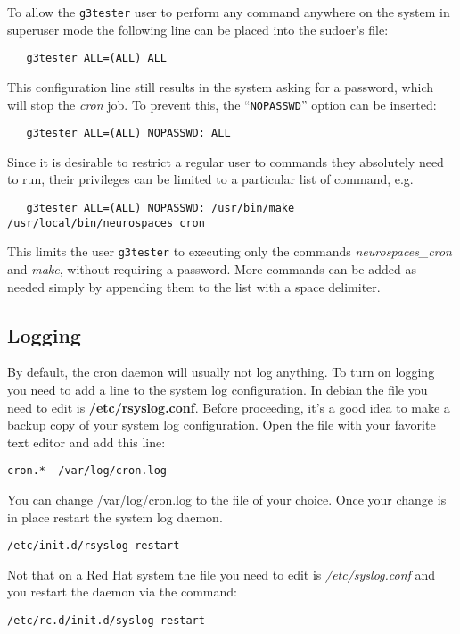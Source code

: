 \documentclass[12pt]{article}
\begin{document}
To allow the {\tt g3tester} user to perform any command anywhere on the system in superuser mode the following line can be placed into the sudoer's file:
\begin{verbatim}
   g3tester ALL=(ALL) ALL
\end{verbatim}
This configuration line still results in the system asking for a password, which will stop the {\it cron} job. To prevent this, the ``{\tt NOPASSWD}'' option can be inserted:
\begin{verbatim}
   g3tester ALL=(ALL) NOPASSWD: ALL
\end{verbatim}
Since it is desirable to restrict a regular user to commands they absolutely need to run, their privileges can be limited to a particular list of command, e.g.
\begin{verbatim}
   g3tester ALL=(ALL) NOPASSWD: /usr/bin/make /usr/local/bin/neurospaces_cron
\end{verbatim}
This limits the user {\tt g3tester} to executing only the commands {\it neurospaces\_cron} and {\it make}, without requiring a password. More commands can be added as needed simply by appending them to the list with a space delimiter. 

\subsection*{Logging}

By default, the cron daemon will usually not log anything. To turn on logging you need to add a line to the system log configuration. In debian the file you need to edit is {\bf /etc/rsyslog.conf}. Before proceeding, it's a good idea to make a backup copy of your system log configuration. Open the file with your favorite text editor and add this line:

\begin{verbatim}
cron.* -/var/log/cron.log
\end{verbatim}

You can change /var/log/cron.log to the file of your choice. Once your change is in place restart the system log daemon. 

\begin{verbatim}
/etc/init.d/rsyslog restart
\end{verbatim}

Not that on a Red Hat system the file you need to edit is {\it /etc/syslog.conf} and you restart the daemon via the command:

\begin{verbatim}
/etc/rc.d/init.d/syslog restart
\end{verbatim}
\end{document}
